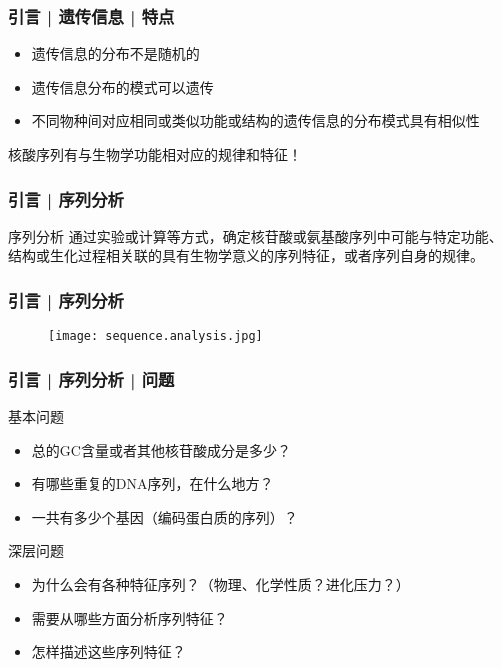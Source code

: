 \begin{frame}
  \frametitle{引言 | 遗传信息 | 特点}
  \begin{itemize}
    \item 遗传信息的分布不是随机的
    \item 遗传信息分布的模式可以遗传
    \item 不同物种间对应相同或类似功能或结构的遗传信息的分布模式具有相似性
  \end{itemize}
  \begin{center}
    \Large{核酸序列有与生物学功能相对应的规律和特征！}
  \end{center}
\end{frame}

\begin{frame}
  \frametitle{引言 | 序列分析}
  \begin{block}{序列分析}
    通过实验或计算等方式，确定核苷酸或氨基酸序列中可能与特定功能、结构或生化过程相关联的\alert{具有生物学意义的序列特征}，或者\alert{序列自身的规律}。
  \end{block}
\end{frame}

\begin{frame}
  \frametitle{引言 | 序列分析}
  \begin{figure}
    \centering
    \texttt{[image: sequence.analysis.jpg]}
  \end{figure}
\end{frame}

\begin{frame}
  \frametitle{引言 | 序列分析 | 问题}
  \begin{block}{基本问题}
    \begin{itemize}
      \item 总的GC含量或者其他核苷酸成分是多少？
      \item 有哪些重复的DNA序列，在什么地方？
      \item 一共有多少个基因（编码蛋白质的序列）？
    \end{itemize}
  \end{block}
  \pause
  \begin{block}{深层问题}
    \begin{itemize}
      \item 为什么会有各种特征序列？（物理、化学性质？进化压力？）
      \item 需要从哪些方面分析序列特征？
      \item 怎样描述这些序列特征？
    \end{itemize}
  \end{block}
\end{frame}

